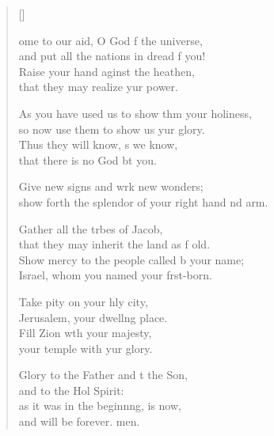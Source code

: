 \settowidth{\versewidth}{show forth the splendor of your right hand and arm.}
\begin{verse}[\versewidth]
  \begin{patverse}
ome to our aid, O God f the universe,\Med\\
and put all the nations in dread f you!\\
Raise your hand aginst the heathen,\Med\\
that they may realize yur power.

As you have used us to show thm your holiness,\Med\\
so now use them to show us yur glory.\\
Thus they will know, s we know,\Med\\
that there is no God bt you.

Give new signs and wrk new wonders;\Med\\
show forth the splendor of your right hand nd arm.

Gather all the tr\pointup{\i}bes of Jacob,\Med\\
that they may inherit the land as f old.\\
Show mercy to the people called b your name;\Med\\
Israel, whom you named your f\pointup{\i}rst-born.

Take pity on your hly city,\Med\\
Jerusalem, your dwell\pointup{\i}ng place.\\
Fill Zion w\pointup{\i}th your majesty,\Med\\
your temple with yur glory.

Glory to the Father and t the Son,\Med\\
and to the Hol Spirit:\\
as it was in the beginn\pointup{\i}ng, is now,\Med\\
and will be forever. men. 
  \end{patverse}
\end{verse}
